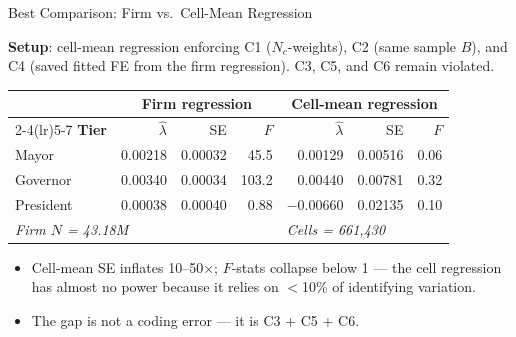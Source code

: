 \documentclass[aspectratio=169,11pt]{beamer}
\begin{document}
\begin{frame}{Best Comparison: Firm vs.\ Cell-Mean Regression}

\footnotesize
\textbf{Setup}: cell-mean regression enforcing C1 ($N_c$-weights), C2 (same sample $B$), and
C4 (saved fitted FE from the firm regression).
C3, C5, and C6 remain violated.

\medskip
\begin{center}
\begin{tabular}{l rrr rrr}
\toprule
 & \multicolumn{3}{c}{\textbf{Firm regression}} & \multicolumn{3}{c}{\textbf{Cell-mean regression}} \\
\cmidrule(lr){2-4}\cmidrule(lr){5-7}
\textbf{Tier} & $\hat\lambda$ & SE & $F$ & $\hat\lambda$ & SE & $F$ \\
\midrule
Mayor     & 0.00218 & 0.00032 & 45.5 & 0.00129 & 0.00516 & 0.06 \\
Governor  & 0.00340 & 0.00034 & 103.2 & 0.00440 & 0.00781 & 0.32 \\
President & 0.00038 & 0.00040 & 0.88 & $-$0.00660 & 0.02135 & 0.10 \\
\midrule
\multicolumn{4}{l}{\textit{Firm $N$ = 43.18M}} & \multicolumn{3}{l}{\textit{Cells = 661,430}} \\
\bottomrule
\end{tabular}
\end{center}

\medskip
\begin{itemize}\setlength{\itemsep}{3pt}
  \item Cell-mean SE inflates 10--50$\times$; $F$-stats collapse below 1 --- the cell regression
        has almost no power because it relies on $<$10\% of identifying variation.
  \item The gap is not a coding error --- it is C3 + C5 + C6.
\end{itemize}

\end{frame}
\end{document}
